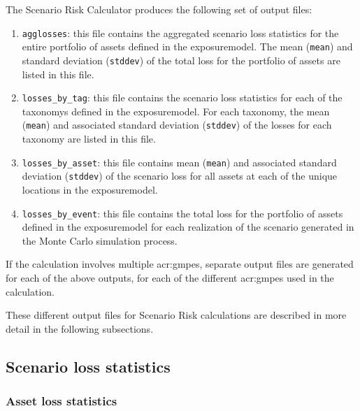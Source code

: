 The Scenario Risk Calculator produces the following set of output files:

\begin{enumerate}

  \item \Verb+agglosses+: this file contains the aggregated scenario
    loss statistics for the entire portfolio of \glspl{asset} defined
    in the \gls{exposuremodel}. The mean (\Verb+mean+) and standard
    deviation (\Verb+stddev+) of the total loss for the portfolio of
    \glspl{asset} are listed in this file.

  \item \Verb+losses_by_tag+: this file contains the scenario
    loss statistics for each of the \glspl{taxonomy} defined in the
    \gls{exposuremodel}. For each \gls{taxonomy}, the mean (\Verb+mean+)
    and associated standard deviation (\Verb+stddev+)
    of the losses for each taxonomy are listed in this file.

  \item \Verb+losses_by_asset+: this file contains mean (\Verb+mean+) and
    associated standard deviation (\Verb+stddev+) of the scenario loss for all
    \glspl{asset} at each of the unique locations in the \gls{exposuremodel}.

  \item \Verb+losses_by_event+: this file contains the total loss for the
    portfolio of \glspl{asset} defined in the \gls{exposuremodel} for each
    realization of the scenario generated in the Monte Carlo simulation process.


\end{enumerate}

If the calculation involves multiple \glspl{acr:gmpe}, separate output files
are generated for each of the above outputs, for each of the different
\glspl{acr:gmpe} used in the calculation.

These different output files for Scenario Risk calculations are described in
more detail in the following subsections.


\subsection{Scenario loss statistics}
\label{subsec:scenario_loss_statistics}

\subsubsection{Asset loss statistics}
\label{subsubsec:scenario_asset_loss_statistics}

